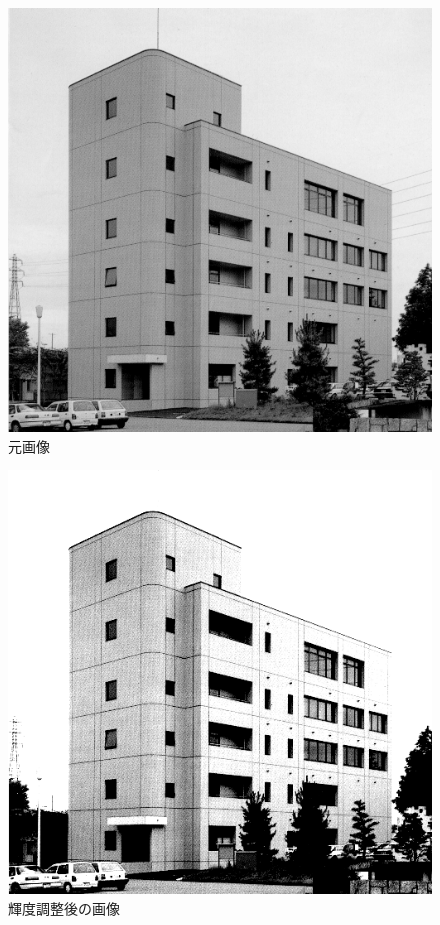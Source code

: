 \documentclass[11pt,a4paper,titlepage,dvipdfmx]{jarticle}
\begin{document}
    \begin{figure}[H]
      \centering
      \includegraphics[scale=.8]{./building.bmp}
      \caption{元画像}
      \label{fig:building}
    \end{figure} 
    \begin{figure}[H]
      \centering
      \includegraphics[scale=.8]{./after-building.bmp}
      \caption{輝度調整後の画像}
      \label{fig:after-building}
    \end{figure} 
\end{document}
